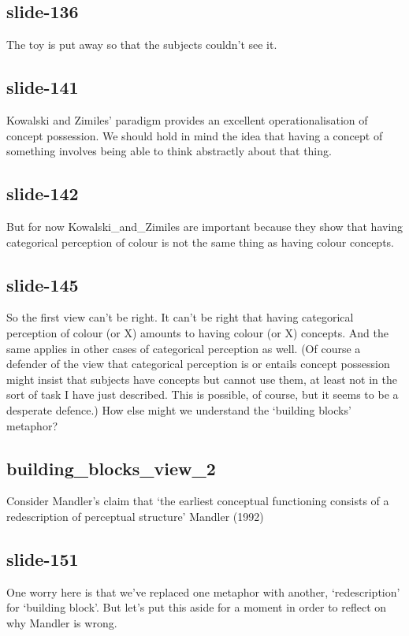 \documentclass[12pt,\papersize]{extarticle}
\begin{document}
 
\subsection{slide-136}
The toy is put away so that the subjects couldn't see it.
 
 
\subsection{slide-141}
Kowalski and Zimiles' paradigm provides an excellent operationalisation of concept possession.
We should hold in mind the idea that having a concept of something involves being able to think abstractly about that thing.
 
 
\subsection{slide-142}
But for now Kowalski_and_Zimiles are important because they show that having categorical perception of colour is not the same thing as having colour concepts.
 
 
\subsection{slide-145}
So the first view can't be right.
It can't be right that having categorical perception of colour (or X) amounts to having colour (or X) concepts.
And the same applies in other cases of categorical perception as well.
(Of course a defender of the view that categorical perception is or entails concept possession might insist that subjects have concepts but cannot use them, at least not in the sort of task I have just described. This is possible, of course, but it seems to be a desperate defence.)
How else might we understand the ‘building blocks’ metaphor?
 
 
\subsection{building\_blocks\_view\_2}
Consider Mandler's claim that ‘the earliest conceptual functioning consists of a redescription of perceptual structure’ Mandler (1992)
 
 
\subsection{slide-151}
One worry here is that we've replaced one metaphor with another, ‘redescription’ for ‘building block’.
But let's put this aside for a moment in order to reflect on why Mandler is wrong.
 
\end{document}
